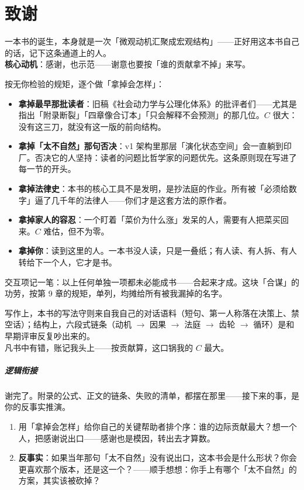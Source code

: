 \documentclass[../../main2.tex]{subfiles}
\begin{document}
\chapter*{致谢}

\begin{motivation}
	一本书的诞生，本身就是一次「微观动机汇聚成宏观结构」——正好用这本书自己的话，记下这条通道上的人。\\
	\textbf{核心动机}：感谢，也示范——谢意也要按「谁的贡献拿不掉」来写。
\end{motivation}

按无你检验的规矩，逐个做「拿掉会怎样」：

\begin{itemize}
	\item \textbf{拿掉最早那批读者}：旧稿《社会动力学与公理化体系》的批评者们——尤其是指出「附录断裂」「四章像合订本」「只会解释不会预测」的那几位。$C$ 很大：没有这三刀，就没有这一版的前向结构。
	\item \textbf{拿掉「太不自然」那句否决}：v1 架构里那层「演化状态空间」会一直躺到印厂。否决它的人坚持：读者的问题比哲学家的问题优先。这条原则现在写进了每一节的开头。
	\item \textbf{拿掉法律史}：本书的核心工具不是发明，是抄法庭的作业。所有被「必须给数字」逼了几千年的法律人——你们才是这套方法的原作者。
	\item \textbf{拿掉家人的容忍}：一个盯着「菜价为什么涨」发呆的人，需要有人把菜买回来。$C$ 难估，但不为零。
	\item \textbf{拿掉你}：读到这里的人。一本书没人读，只是一叠纸；有人读、有人拆、有人转给下一个人，它才是书。
\end{itemize}

交互项记一笔：以上任何单独一项都未必能成书——合起来才成。这块「合谋」的功劳，按第 9 章的规矩，单列，均摊给所有被我漏掉的名字。

写作上，本书的写法守则来自我自己的对话语料（短句、第一人称落在决策上、禁空话）；结构上，六段式链条（动机 $\to$ 因果 $\to$ 法庭 $\to$ 齿轮 $\to$ 循环）是和早期评审反复吵出来的。\\
凡书中有错，账记我头上——按贡献算，这口锅我的 $C$ 最大。

\paragraph*{逻辑衔接}
	谢完了。附录的公式、正文的链条、失败的清单，都摆在那里——接下来的事，是你的反事实推演。

\begin{thinkbox}
\begin{enumerate}
	\item 用「拿掉会怎样」给你自己的关键帮助者排个序：谁的边际贡献最大？想一个人，把感谢说出口——感谢也是模因，转出去才算数。
	\item \textbf{反事实}：如果当年那句「太不自然」没有说出口，这本书会是什么形状？你会更喜欢那个版本，还是这一个？——顺手想想：你手上有哪个「太不自然」的方案，其实该被砍掉？
\end{enumerate}
\end{thinkbox}
\end{document}
